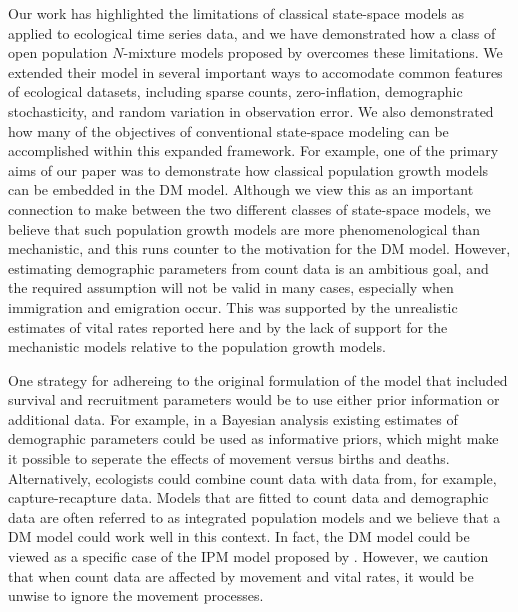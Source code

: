 \documentclass[12pt]{article}
\begin{document}
Our work has highlighted the limitations of classical state-space
models as applied to ecological time series data, and we have
demonstrated how a class of open population $N$-mixture models
proposed by \citet{dail_madsen:2011} overcomes these
limitations. We extended their model in several important
ways to accomodate common features of ecological
datasets, including sparse counts, zero-inflation, demographic
stochasticity, and random variation in observation error.
We also demonstrated how many of the objectives of conventional
state-space modeling can be accomplished within this expanded
framework. For example, one of the primary aims of our paper was to demonstrate how classical
population growth models can be embedded in the DM model.
Although we view this as an important connection to make between the two
different classes of state-space models, we believe that
such population growth models are more phenomenological
than mechanistic, and this runs counter to the motivation for
the DM model. However, estimating
demographic parameters from count data is an ambitious goal, and
the required assumption will not be valid in many cases,
especially when immigration and emigration occur. This was supported by the
unrealistic estimates of vital rates reported here and by the
lack of support for the mechanistic models relative to the population
growth models.

One strategy for adhereing to the original formulation of the
model that included survival and recruitment parameters would be to
use either prior information or additional data. For example, in a
Bayesian analysis existing estimates of demographic parameters
could be used as informative priors, which might make it possible to
seperate the effects of movement versus births and deaths.
Alternatively, ecologists could combine count data with data
from, for example,
capture-recapture data. Models that are fitted to count data and
demographic data are often referred to as integrated population models
\citep[IPM;][]{besbeas_etal:2002,
buckland_etal:2004,schaub_etal:2007}
and we believe that a DM model could work well in this context.
In fact, the DM model could be viewed as a specific case of the
IPM model proposed by \citet{buckland_etal:2004}.
However, we caution that when count data are affected by
movement and vital rates, it would be unwise to ignore the movement
processes.
\end{document}
